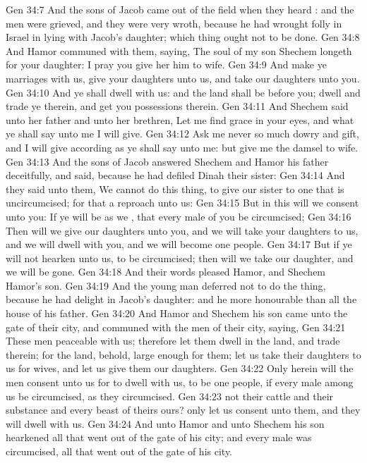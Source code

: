 \vs Gen 34:7 And the sons of Jacob came out of the field when they heard : and the men were grieved, and they were very wroth, because he had wrought folly in Israel in lying with Jacob's daughter; which thing ought not to be done.
\vs Gen 34:8 And Hamor communed with them, saying, The soul of my son Shechem longeth for your daughter: I pray you give her him to wife.
\vs Gen 34:9 And make ye marriages with us,  give your daughters unto us, and take our daughters unto you.
\vs Gen 34:10 And ye shall dwell with us: and the land shall be before you; dwell and trade ye therein, and get you possessions therein.
\vs Gen 34:11 And Shechem said unto her father and unto her brethren, Let me find grace in your eyes, and what ye shall say unto me I will give.
\vs Gen 34:12 Ask me never so much dowry and gift, and I will give according as ye shall say unto me: but give me the damsel to wife.
\vs Gen 34:13 And the sons of Jacob answered Shechem and Hamor his father deceitfully, and said, because he had defiled Dinah their sister:
\vs Gen 34:14 And they said unto them, We cannot do this thing, to give our sister to one that is uncircumcised; for that  a reproach unto us:
\vs Gen 34:15 But in this will we consent unto you: If ye will be as we , that every male of you be circumcised;
\vs Gen 34:16 Then will we give our daughters unto you, and we will take your daughters to us, and we will dwell with you, and we will become one people.
\vs Gen 34:17 But if ye will not hearken unto us, to be circumcised; then will we take our daughter, and we will be gone.
\vs Gen 34:18 And their words pleased Hamor, and Shechem Hamor's son.
\vs Gen 34:19 And the young man deferred not to do the thing, because he had delight in Jacob's daughter: and he  more honourable than all the house of his father.
\vs Gen 34:20 And Hamor and Shechem his son came unto the gate of their city, and communed with the men of their city, saying,
\vs Gen 34:21 These men  peaceable with us; therefore let them dwell in the land, and trade therein; for the land, behold,  large enough for them; let us take their daughters to us for wives, and let us give them our daughters.
\vs Gen 34:22 Only herein will the men consent unto us for to dwell with us, to be one people, if every male among us be circumcised, as they  circumcised.
\vs Gen 34:23  not their cattle and their substance and every beast of theirs  ours? only let us consent unto them, and they will dwell with us.
\vs Gen 34:24 And unto Hamor and unto Shechem his son hearkened all that went out of the gate of his city; and every male was circumcised, all that went out of the gate of his city.
